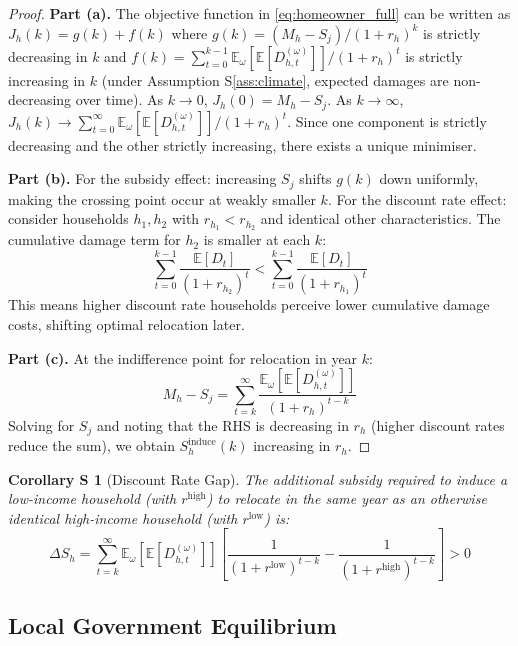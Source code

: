 \documentclass[11pt,letterpaper]{article}
\newtheorem{corollaryS}[theoremS]{Corollary S}
\theoremstyle{definition}
\newcommand{\E}{\mathbb{E}}
\begin{document}
\begin{proof}
\textbf{Part (a).} The objective function in \eqref{eq:homeowner_full} can be written as $J_h(k) = g(k) + f(k)$ where $g(k) = (M_h - S_j)/(1+r_h)^k$ is strictly decreasing in $k$ and $f(k) = \sum_{t=0}^{k-1} \E_\omega[\E[D_{h,t}^{(\omega)}]]/(1+r_h)^t$ is strictly increasing in $k$ (under Assumption S\ref{ass:climate}, expected damages are non-decreasing over time). As $k \to 0$, $J_h(0) = M_h - S_j$. As $k \to \infty$, $J_h(k) \to \sum_{t=0}^{\infty} \E_\omega[\E[D_{h,t}^{(\omega)}]]/(1+r_h)^t$. Since one component is strictly decreasing and the other strictly increasing, there exists a unique minimiser.

\textbf{Part (b).} For the subsidy effect: increasing $S_j$ shifts $g(k)$ down uniformly, making the crossing point occur at weakly smaller $k$. For the discount rate effect: consider households $h_1, h_2$ with $r_{h_1} < r_{h_2}$ and identical other characteristics. The cumulative damage term for $h_2$ is smaller at each $k$:
\begin{equation}
\sum_{t=0}^{k-1} \frac{\E[D_t]}{(1+r_{h_2})^t} < \sum_{t=0}^{k-1} \frac{\E[D_t]}{(1+r_{h_1})^t}
\end{equation}
This means higher discount rate households perceive lower cumulative damage costs, shifting optimal relocation later.

\textbf{Part (c).} At the indifference point for relocation in year $k$:
\begin{equation}
M_h - S_j = \sum_{t=k}^{\infty} \frac{\E_\omega[\E[D_{h,t}^{(\omega)}]]}{(1+r_h)^{t-k}}
\end{equation}
Solving for $S_j$ and noting that the RHS is decreasing in $r_h$ (higher discount rates reduce the sum), we obtain $S_h^{\text{induce}}(k)$ increasing in $r_h$.
\end{proof}

\begin{corollaryS}[Discount Rate Gap]\label{cor:gap}
The additional subsidy required to induce a low-income household (with $r^{\text{high}}$) to relocate in the same year as an otherwise identical high-income household (with $r^{\text{low}}$) is:
\begin{equation}
\Delta S_h = \sum_{t=k}^{\infty} \E_\omega[\E[D_{h,t}^{(\omega)}]] \left[\frac{1}{(1+r^{\text{low}})^{t-k}} - \frac{1}{(1+r^{\text{high}})^{t-k}}\right] > 0
\end{equation}
\end{corollaryS}

\subsection{Local Government Equilibrium}
\end{document}
